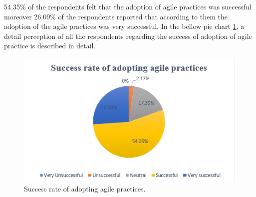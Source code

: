\documentclass[a4paper,oneside]{bth}
\begin{document}
54.35\% of the respondents felt that the adoption of agile practices was successful moreover 26.09\% of the respondents reported that according to them the adoption of the agile practices was very successful. In the bellow pie chart \ref{success rate}, a detail perception of all the respondents regarding the success of adoption of agile practice is described in detail.
\begin{figure}[h]
\centering
\includegraphics[]{success rate.png}
\caption{Success rate of adopting agile practices. \label{success rate}}
\end{figure}
\end{document}
